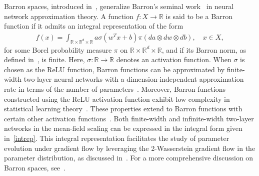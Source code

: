 Barron spaces, introduced in~\cite{ma2022barron}, generalize Barron's seminal work~\cite{barron1993universal} in neural network approximation theory. A function $f: X \to \mathbb{R}$ is said to be a Barron function if it admits an integral representation of the form  
\begin{align}\label{intrep}
    f(x) = \int_{\mathbb{R} \times \mathbb{R}^{d} \times \mathbb{R}} a \sigma(w^T x + b) \pi(da \otimes dw \otimes db), \quad x \in X,
\end{align}  
for some Borel probability measure $\pi$ on $\mathbb{R} \times \mathbb{R}^{d} \times \mathbb{R}$, and if its Barron norm, as defined in~\cite{ma2022barron}, is finite. Here, $\sigma: \mathbb{R} \to \mathbb{R}$ denotes an activation function. When $\sigma$ is chosen as the ReLU function, Barron functions can be approximated by finite-width two-layer neural networks with a dimension-independent approximation rate in terms of the number of parameters~\cite{ma2022barron}. Moreover, Barron functions constructed using the ReLU activation function exhibit low complexity in statistical learning theory~\cite{ma2022barron}. These properties extend to Barron functions with certain other activation functions~\cite{li2020complexity}. Both finite-width and infinite-width two-layer networks in the mean-field scaling can be expressed in the integral form given in~\eqref{intrep}. This integral representation facilitates the study of parameter evolution under gradient flow by leveraging the 2-Wasserstein gradient flow in the parameter distribution, as discussed in~\cite{wojtowytsch2020can,wojtowytsch2020convergence}. For a more comprehensive discussion on Barron spaces, see~\cite{barron1993universal,ma2022barron,li2020complexity,weinan2022representation}.